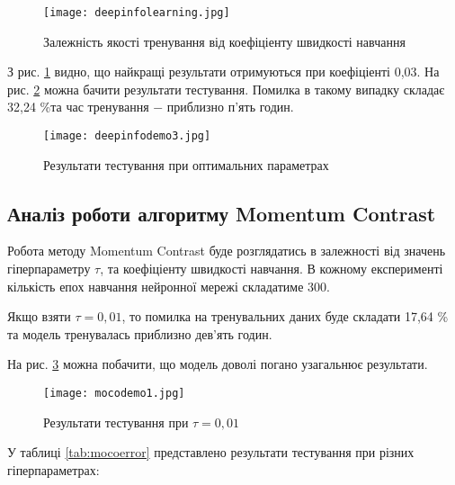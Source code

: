 \begin{figure}[h]
  \texttt{[image: deepinfolearning.jpg]}
  \caption{Залежність якості тренування від коефіціенту швидкості навчання}
  \label{fig:deepinfolearning}
\end{figure}

З рис. \ref{fig:deepinfolearning} видно, що найкращі результати отримуються при коефіціенті 0,03. На рис. \ref{fig:deepinfodemo3} можна бачити результати тестування. Помилка в такому випадку складає 32,24 \%та час тренування $-$ приблизно п'ять годин.

\newpage

\begin{figure}[h]
  \texttt{[image: deepinfodemo3.jpg]}
  \caption{Результати тестування при оптимальних параметрах}
  \label{fig:deepinfodemo3}
\end{figure}

\subsection{Аналіз роботи алгоритму Momentum Contrast}

Робота методу Momentum Contrast буде розглядатись в залежності від значень гіперпараметру $\tau$, та коефіціенту швидкості навчання. В кожному експерименті кількість епох навчання нейронної мережі складатиме 300.

Якщо взяти $\tau = 0,01$, то помилка на тренувальних даних буде складати 17,64 \% та модель тренувалась приблизно дев'ять годин.

На рис. \ref{fig:mocodemo1} можна побачити, що модель доволі погано узагальнює результати.

\vspace{1em}

\begin{figure}[h]
  \texttt{[image: mocodemo1.jpg]}
  \caption{Результати тестування при $\tau = 0,01$}
  \label{fig:mocodemo1}
\end{figure}

У таблиці \ref{tab:mocoerror} представлено результати тестування при різних гіперпараметрах:

